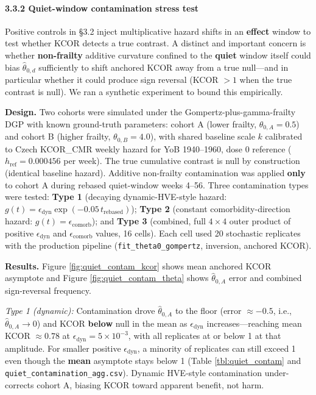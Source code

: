 \documentclass[
]{article}
\begin{document}
\paragraph{3.3.2 Quiet-window contamination stress
test}\label{quiet-window-contamination-stress-test}

Positive controls in §3.2 inject multiplicative hazard shifts in an
\textbf{effect} window to test whether KCOR detects a true contrast. A
distinct and important concern is whether \textbf{non-frailty} additive
curvature confined to the \textbf{quiet} window itself could bias
\(\hat\theta_{0,d}\) sufficiently to shift anchored KCOR away from a
true null---and in particular whether it could produce sign reversal
(KCOR \(>1\) when the true contrast is null). We ran a synthetic
experiment to bound this empirically.

\textbf{Design.} Two cohorts were simulated under the
Gompertz-plus-gamma-frailty DGP with known ground-truth parameters:
cohort A (lower frailty, \(\theta_{0,A}=0.5\)) and cohort B (higher
frailty, \(\theta_{0,B}=4.0\)), with shared baseline scale \(k\)
calibrated to Czech KCOR\_CMR weekly hazard for YoB 1940--1960, dose 0
reference (\(h_{\mathrm{ref}}=0.000456\) per week). The true cumulative
contrast is null by construction (identical baseline hazard). Additive
non-frailty contamination was applied \textbf{only} to cohort A during
rebased quiet-window weeks 4--56. Three contamination types were tested:
\textbf{Type 1} (decaying dynamic-HVE-style hazard:
\(g(t)=\epsilon_{\mathrm{dyn}}\exp(-0.05\,t_{\mathrm{rebased}})\));
\textbf{Type 2} (constant comorbidity-direction hazard:
\(g(t)=\epsilon_{\mathrm{comorb}}\)); and \textbf{Type 3} (combined,
full \(4\times4\) outer product of positive \(\epsilon_{\mathrm{dyn}}\)
and \(\epsilon_{\mathrm{comorb}}\) values, 16 cells). Each cell used 20
stochastic replicates with the production pipeline
(\texttt{fit\_theta0\_gompertz}, inversion, anchored KCOR).

\textbf{Results.} Figure \ref{fig:quiet_contam_kcor} shows mean anchored
KCOR asymptote and Figure \ref{fig:quiet_contam_theta} shows
\(\hat\theta_{0,A}\) error and combined sign-reversal frequency.

\emph{Type 1 (dynamic):} Contamination drove \(\hat\theta_{0,A}\) to the
floor (error \(\approx -0.5\), i.e., \(\hat\theta_{0,A}\to0\)) and KCOR
\textbf{below} null in the mean as \(\epsilon_{\mathrm{dyn}}\)
increases---reaching mean KCOR \(\approx0.78\) at
\(\epsilon_{\mathrm{dyn}}=5\times10^{-3}\), with all replicates at or
below 1 at that amplitude. For smaller positive
\(\epsilon_{\mathrm{dyn}}\), a minority of replicates can still exceed 1
even though the \textbf{mean} asymptote stays below 1 (Table
\ref{tbl:quiet_contam} and \texttt{quiet\_contamination\_agg.csv}).
Dynamic HVE-style contamination under-corrects cohort A, biasing KCOR
toward apparent benefit, not harm.
\end{document}
